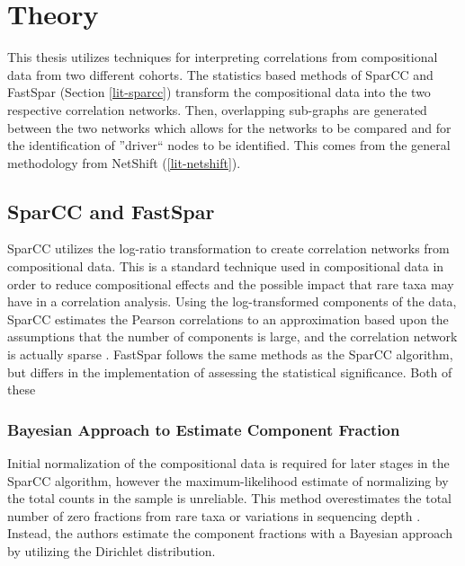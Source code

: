 
\chapter{Theory}


This thesis utilizes techniques for interpreting correlations from compositional data from two different cohorts. The statistics based methods of SparCC and FastSpar (Section \ref{lit-sparcc}) transform the compositional data into the two respective correlation networks. Then, overlapping sub-graphs are generated between the two networks which allows for the networks to be compared and for the identification of ''driver`` nodes to be identified. This comes from the general methodology from NetShift (\ref{lit-netshift}).


\section{SparCC and FastSpar} \label{theory-sparcc}

SparCC utilizes the log-ratio transformation to create correlation networks from compositional data. This is a standard technique used in compositional data in order to reduce compositional effects and the possible impact that rare taxa may have in a correlation analysis. Using the log-transformed components of the data, SparCC estimates the Pearson correlations to an approximation based upon the assumptions that the number of components is large, and the correlation network is actually sparse \citep{Friedman2012}. FastSpar follows the same methods as the SparCC algorithm, but differs in the implementation of assessing the statistical significance. Both of these 

\subsection{Bayesian Approach to Estimate Component Fraction}\label{theory-bayes}
Initial normalization of the compositional data is required for later stages in the SparCC algorithm, however the maximum-likelihood estimate of normalizing by the total counts in the sample is unreliable. This method overestimates the total number of zero fractions from rare taxa or variations in sequencing depth \citep{Agresti2005,Friedman2012}. Instead, the authors estimate the component fractions with a Bayesian approach by utilizing the Dirichlet distribution.

